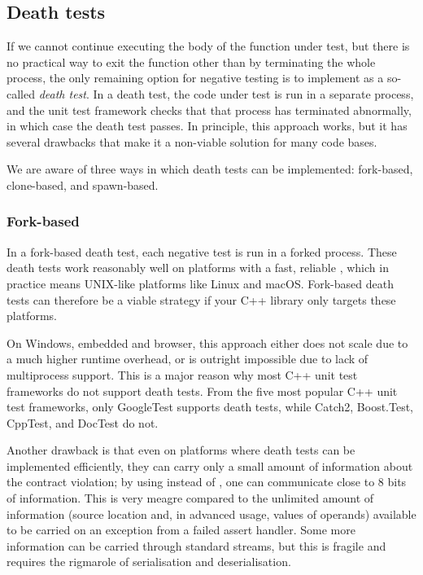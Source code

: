 \subsection{Death tests}
\label{subsec:deathtests}

If we cannot continue executing the body of the function under test, but there is no practical way to exit the function other than by terminating the whole process, the only remaining option for negative testing is to implement  as a so-called \emph{death test}. In a death test, the code under test is run in a separate process, and the unit test framework checks that that process has terminated abnormally, in which case the death test passes. In principle, this approach works, but it has several drawbacks that make it a non-viable solution for many code bases.

We are aware of three ways in which death tests can be implemented: fork-based, clone-based, and spawn-based.

\subsubsection{Fork-based}

In a fork-based death test, each negative test is run in a forked process. These death tests work reasonably well on platforms with a fast, reliable , which in practice means UNIX-like platforms like Linux and macOS. Fork-based death tests can therefore be a viable strategy if your C++ library only targets these platforms.

On Windows, embedded and browser, this approach either does not scale due to a much higher runtime overhead, or is outright impossible due to lack of multiprocess support. This is a major reason why most C++ unit test frameworks do not support death tests. From the five most popular C++ unit test frameworks, only GoogleTest supports death tests, while Catch2, Boost.Test, CppTest, and DocTest do not.

Another drawback is that even on platforms where death tests can be implemented efficiently, they can carry only a small amount of information about the contract violation; by using  instead of , one can communicate close to 8 bits of information. This is very meagre compared to the unlimited amount of information (source location and, in advanced usage, values of operands) available to be carried on an exception from a failed assert handler. Some more information can be carried through standard streams, but this is fragile and requires the rigmarole of serialisation and deserialisation.

